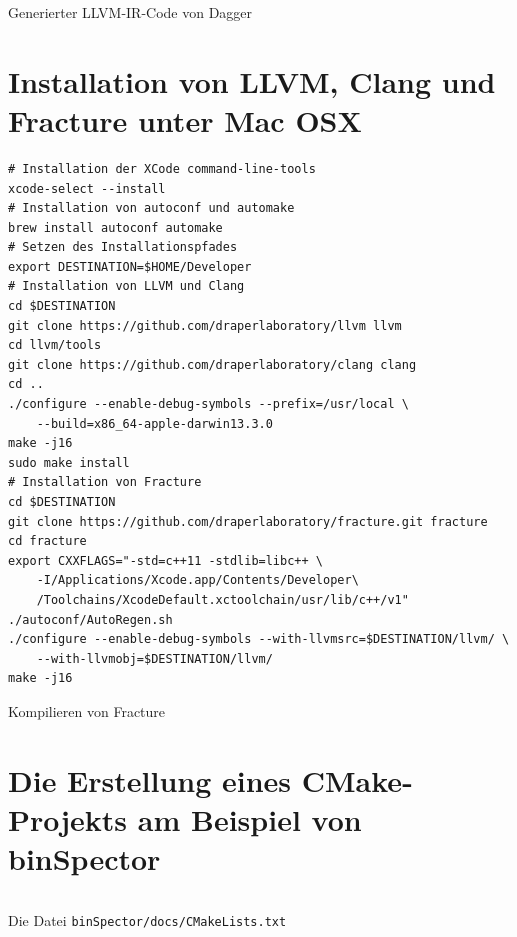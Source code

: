 \begin{code}
\inputminted[linenos]{llvm}{../Resources/Code/c-to-llvm/dagger/main.dagger.ll}
\caption{Generierter LLVM-IR-Code von Dagger}
\label{lst:llvm-von-obj-mit-dagger}
\end{code}

\newpage

\section{Installation von LLVM, Clang und Fracture unter Mac OSX}
\label{sec:installation-von-llvm-clang-und-fracture-unter-mac-osx}

\begin{code}
\begin{verbatim}
# Installation der XCode command-line-tools
xcode-select --install
# Installation von autoconf und automake
brew install autoconf automake
# Setzen des Installationspfades
export DESTINATION=$HOME/Developer
# Installation von LLVM und Clang
cd $DESTINATION
git clone https://github.com/draperlaboratory/llvm llvm
cd llvm/tools
git clone https://github.com/draperlaboratory/clang clang
cd ..
./configure --enable-debug-symbols --prefix=/usr/local \
    --build=x86_64-apple-darwin13.3.0
make -j16
sudo make install
# Installation von Fracture
cd $DESTINATION
git clone https://github.com/draperlaboratory/fracture.git fracture
cd fracture
export CXXFLAGS="-std=c++11 -stdlib=libc++ \
    -I/Applications/Xcode.app/Contents/Developer\
    /Toolchains/XcodeDefault.xctoolchain/usr/lib/c++/v1"
./autoconf/AutoRegen.sh
./configure --enable-debug-symbols --with-llvmsrc=$DESTINATION/llvm/ \
    --with-llvmobj=$DESTINATION/llvm/
make -j16
\end{verbatim}
\caption{Kompilieren von Fracture}
\label{lst:kompilieren-von-fracture}
\end{code}

\newpage

\section{Die Erstellung eines CMake-Projekts am Beispiel von binSpector}
\label{sec:die_erstellung_eines_cmake_projekts_am_beispiel_von_binspector}

\begin{code}
    \inputminted[linenos]{cmake}{/Users/michaelriedel/Developer/binSpector/docs/CMakeLists.txt}
    \caption{Die Datei \texttt{binSpector/docs/CMakeLists.txt}}
    \label{lst:binspector_docs_cmakelists_txt}
\end{code}

